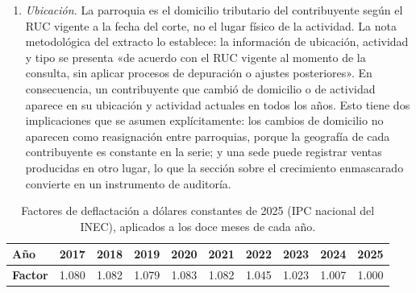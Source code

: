 \documentclass[12pt,a4paper]{article}
\begin{document}
\begin{enumerate}[label=\arabic*.,leftmargin=0.5in,labelwidth=0.25in,labelsep=0pt,align=left,itemsep=6pt,parsep=0pt,topsep=0pt]
  \item \textit{Ubicación.} La parroquia es el domicilio tributario del contribuyente según el RUC vigente a la fecha del corte, no el lugar físico de la actividad. La nota metodológica del extracto lo establece: la información de ubicación, actividad y tipo se presenta «de acuerdo con el RUC vigente al momento de la consulta, sin aplicar procesos de depuración o ajustes posteriores». En consecuencia, un contribuyente que cambió de domicilio o de actividad aparece en su ubicación y actividad actuales en todos los años. Esto tiene dos implicaciones que se asumen explícitamente: los cambios de domicilio no aparecen como reasignación entre parroquias, porque la geografía de cada contribuyente es constante en la serie; y una sede puede registrar ventas producidas en otro lugar, lo que la sección sobre el crecimiento enmascarado convierte en un instrumento de auditoría.
\end{enumerate}
\par

\begin{table}[H]
  \caption[Factores de deflactación a dólares de 2025]{Factores de deflactación a dólares constantes de 2025 (IPC nacional del INEC), aplicados a los doce meses de cada año.}
  \label{tab:deflactor}
  \begin{tabular}{|l|c|c|c|c|c|c|c|c|c|}
    \hline
    \textbf{Año}    & 2017  & 2018  & 2019  & 2020  & 2021  & 2022  & 2023  & 2024  & 2025  \\ \hline
    \textbf{Factor} & 1.080 & 1.082 & 1.079 & 1.083 & 1.082 & 1.045 & 1.023 & 1.007 & 1.000 \\ \hline
  \end{tabular}
\end{table}
\end{document}
